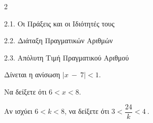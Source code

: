 \begin{ylh}{2}
    \item 2.1. Οι Πράξεις και οι Ιδιότητές τους
    \item 2.2. Διάταξη Πραγματικών Αριθμών
    \item 2.3. Απόλυτη Τιμή Πραγματικού Αριθμού
\end{ylh}
Δίνεται η ανίσωση $|x\  - \ 7| < 1$.
\begin{alist}
\item Να δείξετε ότι $6 < x < 8$.
\item Αν ισχύει $6 < k < 8$, να δείξετε ότι $3 < \dfrac{24}{k} < 4\ $.
\end{alist}

